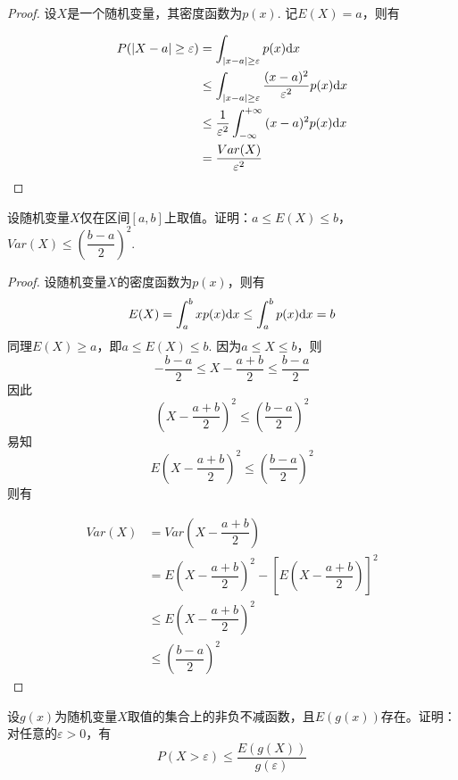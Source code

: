 \begin{proof}

    设$X$是一个随机变量，其密度函数为$p(x)$. 记$E(X) = a$，则有

    \begin{align*}
        P(|X - a| \geq \varepsilon) & = \int_{|x - a| \geq \varepsilon}{p(x)}\mathrm{d} x \\
        & \leq \int_{|x - a| \geq \varepsilon}{\dfrac{(x - a)^2}{\varepsilon^2}p(x)}\mathrm{d} x \\
        & \leq \dfrac{1}{\varepsilon^2}\int_{-\infty}^{+\infty}{(x - a)^2p(x)}\mathrm{d} x \\
        & = \dfrac{Var(X)}{\varepsilon^2}
    \end{align*}
    
\end{proof}

\begin{proposition}
    
    设随机变量$X$仅在区间$[a,b]$上取值。证明：$a \leq E(X) \leq b$，$Var(X) \leq \left( \dfrac{b - a}{2} \right)^2$.

\end{proposition}

\begin{proof}

    设随机变量$X$的密度函数为$p(x)$，则有
    \[E(X) = \int_{a}^{b}{xp(x)}\mathrm{d} x \leq \int_{a}^{b}{p(x)}\mathrm{d} x = b\]
    同理$E(X) \geq a$，即$a \leq E(X) \leq b$.
    因为$a \leq X \leq b$，则
    \[-\dfrac{b - a}{2} \leq X - \dfrac{a + b}{2} \leq \dfrac{b - a}{2}\]
    因此
    \[\left( X - \dfrac{a + b}{2} \right)^2 \leq \left( \dfrac{b - a}{2} \right)^2\]
    易知
    \[E \left( X - \dfrac{a + b}{2} \right)^2 \leq \left( \dfrac{b - a}{2} \right)^2\]
    则有
    
    \begin{align*}
        Var(X) & = Var\left( X - \dfrac{a + b}{2} \right) \\
        & = E \left( X - \dfrac{a + b}{2} \right)^2 - \left[ E\left( X - \dfrac{a + b}{2} \right) \right]^2 \\
        & \leq E\left( X - \dfrac{a + b}{2} \right)^2 \\
        & \leq \left( \dfrac{b - a}{2} \right)^2
    \end{align*}

\end{proof}

\begin{proposition}

    设$g(x)$为随机变量$X$取值的集合上的非负不减函数，且$E(g(x))$存在。证明：对任意的$\varepsilon > 0$，有
    \[P(X > \varepsilon) \leq \dfrac{E(g(X))}{g(\varepsilon)}\]

\end{proposition}

